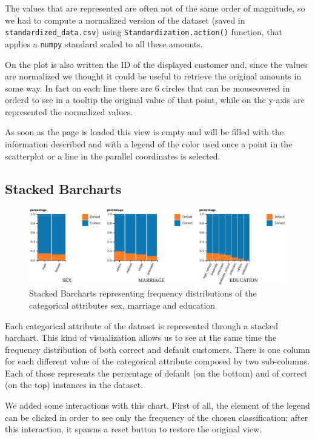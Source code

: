 \documentclass[journal]{vgtc}                %
\begin{document}
The values that are represented are often not of the same order of magnitude, so we had to compute a normalized version of the dataset (saved in \texttt{standardized\_data.csv}) using \texttt{Standardization.action()} function, that applies
a \texttt{numpy} standard scaled to all these amounts.

On the plot is also written the ID of the displayed customer and, since the values are normalized we thought it could be useful to retrieve the original amounts in some way. In fact on each line there are 6 circles that can be mouseovered in orderd to see in a tooltip
the original value of that point, while on the y-axis are represented the normalized values.

As soon as the page is loaded this view is empty and will be filled with the information described and with a legend of the color used once a point in the scatterplot or a line in the parallel coordinates is selected.

\subsection{Stacked Barcharts}
\begin{figure}[h]
  \centering
  \includegraphics[scale=0.15]{stacked}
  \caption{Stacked Barcharts representing frequency distributions of the categorical attributes sex, marriage and education}
  \label{stacked}
\end{figure}

Each categorical attribute of the dataset is represented through a stacked barchart. This kind of visualization allows us to see at the same time the frequency distribution of both correct and default customers.
There is one column for each different value of the categorical attribute composed by two sub-columns. Each of those represents the percentage of default (on the bottom) and of correct (on the top) instances in the dataset.

We added some interactions with this chart. First of all, the element of the legend can be clicked in order to see only the frequency of the chosen classification;
after this interaction, it spawns a reset button to restore the original view.
\end{document}
